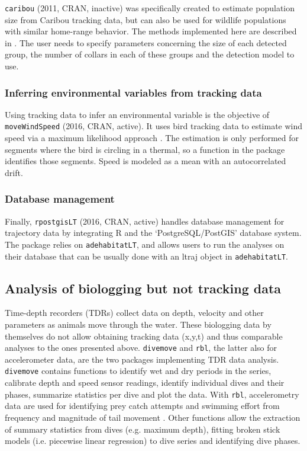 \documentclass[a4paper,12pt]{article}
\newcommand{\Rpkg}[1]{\texttt{#1}}
\begin{document}
\Rpkg{caribou} (2011, CRAN, inactive) was specifically created to estimate population size from Caribou tracking data, but can also be used for wildlife populations with similar home-range behavior. The methods implemented here are described in \cite{Rivest1998}. The user needs to specify parameters concerning the size of each detected group, the number of collars in each of these groups and the detection model to use. 

\subsubsection*{Inferring environmental variables from tracking data}

Using tracking data to infer an environmental variable is the objective of \Rpkg{moveWindSpeed} (2016, CRAN, active). It uses bird tracking data to estimate wind speed via a maximum likelihood approach \citep{Weinzierl2016}. The estimation is only performed for segments where the bird is circling in a thermal, so a function in the package identifies those segments. Speed is modeled as a mean with an autocorrelated drift. 

\subsubsection*{Database management}

Finally, \Rpkg{rpostgisLT} (2016, CRAN, active) handles database management for trajectory data by integrating R and the `PostgreSQL/PostGIS' database system. The package relies on \Rpkg{adehabitatLT}, and allows users to run the analyses on their database that can be usually done with an ltraj object in \Rpkg{adehabitatLT}. 

\subsection*{Analysis of biologging but not tracking data}

Time-depth recorders (TDRs) collect data on depth, velocity and other parameters as animals move through the water. These biologging data by themselves do not allow obtaining tracking data (x,y,t) and thus comparable analyses to the ones presented above. \Rpkg{divemove} and \Rpkg{rbl}, the latter also for accelerometer data, are the two packages implementing TDR data analysis. \Rpkg{divemove} contains functions to identify wet and dry periods in the series, calibrate depth and speed sensor readings, identify individual dives and their phases, summarize statistics per dive and plot the data. With \Rpkg{rbl}, accelerometry data are used for identifying prey catch attempts \citep{Viviant2010} and swimming effort from frequency and magnitude of tail movement \citep{Bras2016}. Other functions allow the extraction of summary statistics from dives (e.g. maximum depth), fitting broken stick models (i.e. piecewise linear regression) to dive series and identifying dive phases. 
\end{document}

